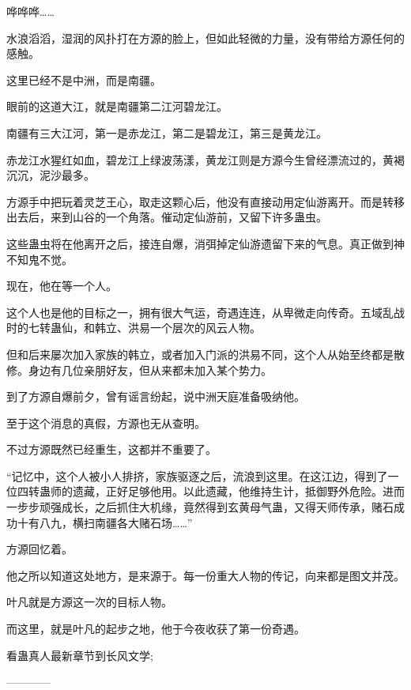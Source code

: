 \begin{this_body}
哗哗哗……

水浪滔滔，湿润的风扑打在方源的脸上，但如此轻微的力量，没有带给方源任何的感触。

这里已经不是中洲，而是南疆。

眼前的这道大江，就是南疆第二江河碧龙江。

南疆有三大江河，第一是赤龙江，第二是碧龙江，第三是黄龙江。

赤龙江水猩红如血，碧龙江上绿波荡漾，黄龙江则是方源今生曾经漂流过的，黄褐沉沉，泥沙最多。

方源手中把玩着灵芝王心，取走这颗心后，他没有直接动用定仙游离开。而是转移出去后，来到山谷的一个角落。催动定仙游前，又留下许多蛊虫。

这些蛊虫将在他离开之后，接连自爆，消弭掉定仙游遗留下来的气息。真正做到神不知鬼不觉。

现在，他在等一个人。

这个人也是他的目标之一，拥有很大气运，奇遇连连，从卑微走向传奇。五域乱战时的七转蛊仙，和韩立、洪易一个层次的风云人物。

但和后来屡次加入家族的韩立，或者加入门派的洪易不同，这个人从始至终都是散修。身边有几位亲朋好友，但从来都未加入某个势力。

到了方源自爆前夕，曾有谣言纷起，说中洲天庭准备吸纳他。

至于这个消息的真假，方源也无从查明。

不过方源既然已经重生，这都并不重要了。

“记忆中，这个人被小人排挤，家族驱逐之后，流浪到这里。在这江边，得到了一位四转蛊师的遗藏，正好足够他用。以此遗藏，他维持生计，抵御野外危险。进而一步步顽强成长，之后抓住大机缘，竟然得到玄黄母气蛊，又得天师传承，赌石成功十有八九，横扫南疆各大赌石场……”

方源回忆着。

他之所以知道这处地方，是来源于。每一份重大人物的传记，向来都是图文并茂。

叶凡就是方源这一次的目标人物。

而这里，就是叶凡的起步之地，他于今夜收获了第一份奇遇。

看蛊真人最新章节到长风文学;

------------

\end{this_body}

